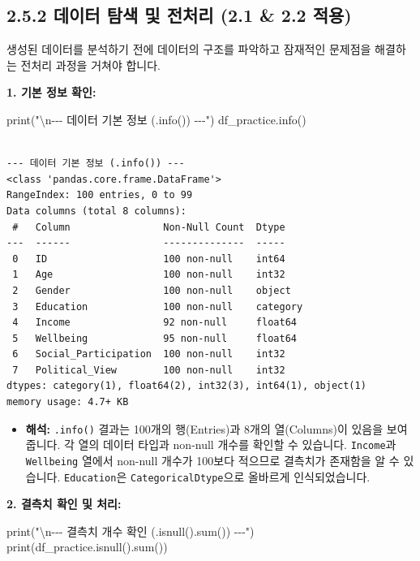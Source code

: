 \documentclass[
  letterpaper,
]{book}
\newenvironment{Shaded}{\begin{snugshade}}{\end{snugshade}}
\newcommand{\BuiltInTok}[1]{\textcolor[rgb]{0.00,0.23,0.31}{#1}}
\newcommand{\CharTok}[1]{\textcolor[rgb]{0.13,0.47,0.30}{#1}}
\newcommand{\NormalTok}[1]{\textcolor[rgb]{0.00,0.23,0.31}{#1}}
\newcommand{\StringTok}[1]{\textcolor[rgb]{0.13,0.47,0.30}{#1}}
\providecommand{\tightlist}{%
  \setlength{\itemsep}{0pt}\setlength{\parskip}{0pt}}
\begin{document}
\subsection{2.5.2 데이터 탐색 및 전처리 (2.1 \& 2.2
적용)}\label{uxb370uxc774uxd130-uxd0d0uxc0c9-uxbc0f-uxc804uxcc98uxb9ac-2.1-2.2-uxc801uxc6a9}

생성된 데이터를 분석하기 전에 데이터의 구조를 파악하고 잠재적인 문제점을
해결하는 전처리 과정을 거쳐야 합니다.

\textbf{1. 기본 정보 확인:}

\begin{Shaded}
\begin{Highlighting}[]
\BuiltInTok{print}\NormalTok{(}\StringTok{"}\CharTok{\textbackslash{}n}\StringTok{{-}{-}{-} 데이터 기본 정보 (.info()) {-}{-}{-}"}\NormalTok{)}
\NormalTok{df\_practice.info()}
\end{Highlighting}
\end{Shaded}

\begin{verbatim}

--- 데이터 기본 정보 (.info()) ---
<class 'pandas.core.frame.DataFrame'>
RangeIndex: 100 entries, 0 to 99
Data columns (total 8 columns):
 #   Column                Non-Null Count  Dtype   
---  ------                --------------  -----   
 0   ID                    100 non-null    int64   
 1   Age                   100 non-null    int32   
 2   Gender                100 non-null    object  
 3   Education             100 non-null    category
 4   Income                92 non-null     float64 
 5   Wellbeing             95 non-null     float64 
 6   Social_Participation  100 non-null    int32   
 7   Political_View        100 non-null    int32   
dtypes: category(1), float64(2), int32(3), int64(1), object(1)
memory usage: 4.7+ KB
\end{verbatim}

\begin{itemize}
\tightlist
\item
  \textbf{해석:} \texttt{.info()} 결과는 100개의 행(Entries)과 8개의
  열(Columns)이 있음을 보여줍니다. 각 열의 데이터 타입과 non-null 개수를
  확인할 수 있습니다. \texttt{Income}과 \texttt{Wellbeing} 열에서
  non-null 개수가 100보다 적으므로 결측치가 존재함을 알 수 있습니다.
  \texttt{Education}은 \texttt{CategoricalDtype}으로 올바르게
  인식되었습니다.
\end{itemize}

\textbf{2. 결측치 확인 및 처리:}

\begin{Shaded}
\begin{Highlighting}[]
\BuiltInTok{print}\NormalTok{(}\StringTok{"}\CharTok{\textbackslash{}n}\StringTok{{-}{-}{-} 결측치 개수 확인 (.isnull().sum()) {-}{-}{-}"}\NormalTok{)}
\BuiltInTok{print}\NormalTok{(df\_practice.isnull().}\BuiltInTok{sum}\NormalTok{())}
\end{Highlighting}
\end{Shaded}
\end{document}
